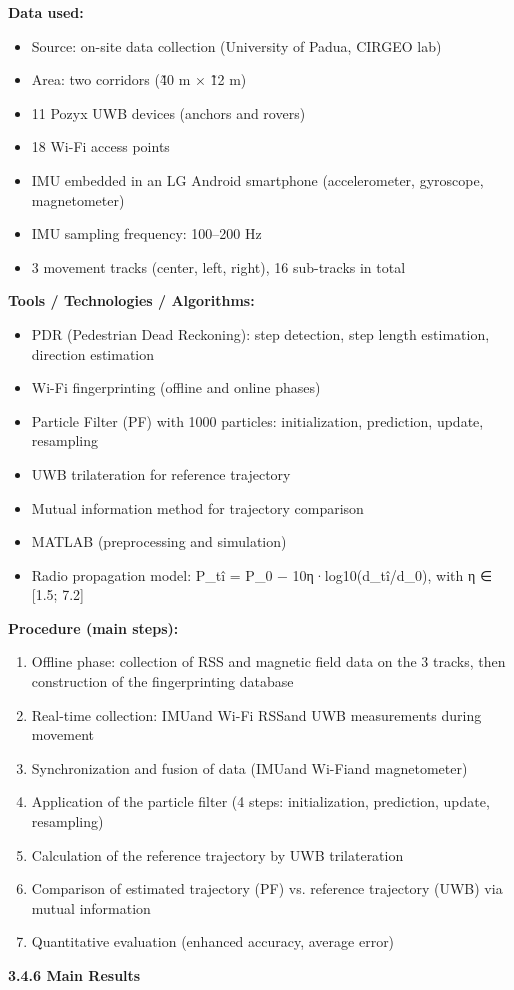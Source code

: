 \documentclass{ipgpmaster}
\begin{document}
\textbf{Data used:}
\begin{itemize}
    \item Source: on-site data collection (University of Padua, CIRGEO lab)
    \item Area: two corridors (\~40 m × \~12 m)
    \item 11 Pozyx UWB devices (anchors and rovers)
    \item 18 Wi-Fi access points
    \item IMU embedded in an LG Android smartphone (accelerometer, gyroscope, magnetometer)
    \item IMU sampling frequency: 100–200 Hz
    \item 3 movement tracks (center, left, right), 16 sub-tracks in total


\end{itemize}
\textbf{Tools / Technologies / Algorithms:}
\begin{itemize}
    \item PDR (Pedestrian Dead Reckoning): step detection, step length estimation, direction estimation
    \item Wi-Fi fingerprinting (offline and online phases)
    \item Particle Filter (PF) with 1000 particles: initialization, prediction, update, resampling
    \item UWB trilateration for reference trajectory
    \item Mutual information method for trajectory comparison
    \item MATLAB (preprocessing and simulation)
    \item Radio propagation model: P\_t\^i = P\_0 − 10η·log10(d\_t\^i/d\_0), with η ∈ [1.5; 7.2]



\end{itemize}
\textbf{Procedure (main steps):}
\begin{enumerate}
    \item Offline phase: collection of RSS and magnetic field data on the 3 tracks, then construction of the fingerprinting database
    \item Real-time collection: IMUand  Wi-Fi RSSand  UWB measurements during movement
    \item Synchronization and fusion of data (IMUand  Wi-Fiand  magnetometer)
    \item Application of the particle filter (4 steps: initialization, prediction, update, resampling)
    \item Calculation of the reference trajectory by UWB trilateration
    \item Comparison of estimated trajectory (PF) vs. reference trajectory (UWB) via mutual information
    \item Quantitative evaluation (enhanced accuracy, average error)




\end{enumerate}
 \textbf{3.4.6 Main Results}
\end{document}
